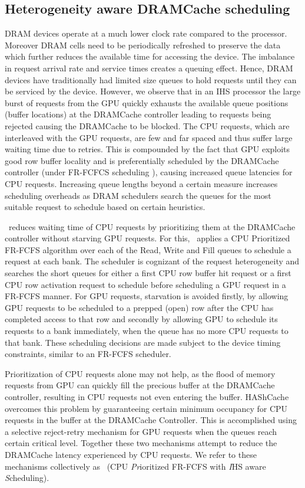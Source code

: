 \subsection{Heterogeneity aware DRAMCache scheduling} 
DRAM devices operate at a much lower clock rate compared to the processor. Moreover DRAM cells need to be periodically refreshed to preserve the data which further reduces the available time for accessing the device. The imbalance in request arrival rate and service times creates a queuing effect. Hence, DRAM devices have traditionally had limited size queues to hold requests until they can be serviced by the device. However, we observe that in an IHS processor the large burst of requests from the GPU quickly exhausts the available queue positions (buffer locations) at the DRAMCache controller leading to requests being rejected causing the DRAMCache to be blocked. 
The CPU requests, which are interleaved with the GPU requests, are few and far spaced and thus suffer large waiting time due to retries. This is compounded by the fact that GPU exploits good row buffer locality and is preferentially scheduled by the DRAMCache controller (under FR-FCFCS scheduling \cite{sms}), causing increased queue latencies for CPU requests. Increasing queue lengths beyond a certain measure increases scheduling overheads as DRAM schedulers search the queues for the most suitable request to schedule based on certain heuristics.
\par \cachename\ reduces waiting time of CPU requests by prioritizing them at the DRAMCache controller without starving GPU requests. 
For this, \cachename\ applies a CPU Prioritized FR-FCFS algorithm over each of the Read, Write and Fill queues to schedule a request at each bank. 
The scheduler is cognizant of the request heterogeneity and searches the short queues for either a first CPU row buffer hit request or a first CPU row activation request to schedule before scheduling a GPU request in a FR-FCFS manner. For GPU requests, starvation is avoided firstly, by allowing GPU requests to be scheduled to a prepped (open) row after the CPU has completed access to that row and secondly by allowing GPU to schedule its requests to a bank immediately, when the queue has no more CPU requests to that bank. These scheduling decisions are made subject to the device timing constraints, similar to an FR-FCFS scheduler.
\par Prioritization of CPU requests alone may not help, as the flood of memory requests from  GPU can quickly fill the precious buffer at the DRAMCache controller, resulting in CPU requests not even entering the buffer. HAShCache overcomes this problem by guaranteeing certain minimum occupancy for CPU requests in the buffer at the DRAMCache Controller. This is accomplished using a selective reject-retry mechanism for GPU requests when the queues reach certain critical level.  Together these two mechanisms attempt to reduce the DRAMCache latency experienced by CPU requests.  We refer to these  mechanisms collectively as \prioname\ (CPU \emph{Pr}ioritized FR-FCFS with \emph{I}HS aware \emph{S}cheduling). 
